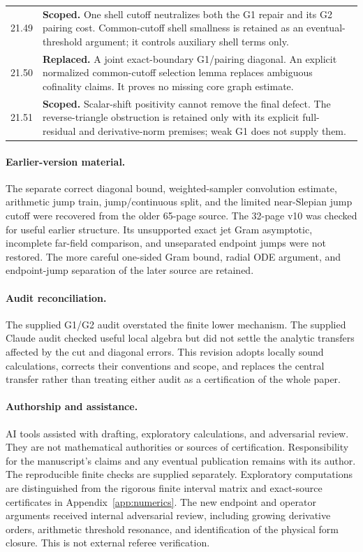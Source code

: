 \documentclass[11pt]{article}
\theoremstyle{remark}
\begin{document}
\begin{longtable}{@{}p{}p{}@{}}
21.49 & \textbf{Scoped.} One shell cutoff neutralizes both the G1 repair and its G2 pairing cost. Common-cutoff shell smallness is retained as an eventual-threshold argument; it controls auxiliary shell terms only. \\[4pt]
21.50 & \textbf{Replaced.} A joint exact-boundary G1/pairing diagonal. An explicit normalized common-cutoff selection lemma replaces ambiguous cofinality claims. It proves no missing core graph estimate. \\[4pt]
21.51 & \textbf{Scoped.} Scalar-shift positivity cannot remove the final defect. The reverse-triangle obstruction is retained only with its explicit full-residual and derivative-norm premises; weak G1 does not supply them. \\[4pt]
\end{longtable}
\normalsize
\paragraph{Earlier-version material.}
The separate correct diagonal bound, weighted-sampler convolution estimate,
arithmetic jump train, jump/continuous split, and the limited near-Slepian
jump cutoff were recovered from the older 65-page source. The 32-page v10
was checked for useful earlier structure. Its unsupported exact jet
Gram asymptotic, incomplete far-field comparison, and unseparated endpoint
jumps were not restored. The more careful one-sided Gram bound, radial ODE
argument, and endpoint-jump separation of the later source are retained.

\paragraph{Audit reconciliation.}
The supplied G1/G2 audit overstated the finite lower mechanism. The supplied
Claude audit checked useful local algebra but did not settle the analytic
transfers affected by the cut and diagonal errors. This revision adopts
locally sound calculations, corrects their conventions and scope, and
replaces the central transfer rather than treating either audit as a
certification of the whole paper.

\paragraph{Authorship and assistance.}
AI tools assisted with drafting, exploratory calculations, and adversarial
review. They are not mathematical authorities or sources of certification.
Responsibility for the manuscript's claims and any eventual publication
remains with its author. The reproducible finite checks are supplied separately. Exploratory
computations are distinguished from the rigorous finite interval
matrix and exact-source certificates in Appendix~\ref{app:numerics}.
The new endpoint and operator arguments received internal adversarial
review, including growing derivative orders, arithmetic threshold
resonance, and identification of the physical form closure. This is
not external referee verification.
\end{document}
